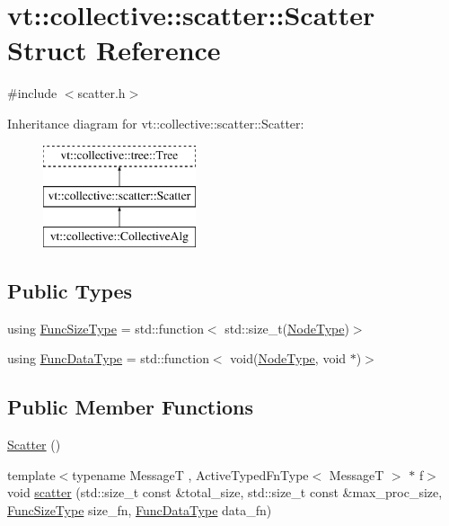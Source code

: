 \hypertarget{structvt_1_1collective_1_1scatter_1_1_scatter}{}\section{vt\+:\+:collective\+:\+:scatter\+:\+:Scatter Struct Reference}
\label{structvt_1_1collective_1_1scatter_1_1_scatter}


{\ttfamily \#include $<$scatter.\+h$>$}

Inheritance diagram for vt\+:\+:collective\+:\+:scatter\+:\+:Scatter\+:\begin{figure}[H]
\begin{center}
\leavevmode
\includegraphics[height=3.000000cm]{structvt_1_1collective_1_1scatter_1_1_scatter}
\end{center}
\end{figure}
\subsection*{Public Types}
\begin{DoxyCompactItemize}
\item 
using \hyperlink{structvt_1_1collective_1_1scatter_1_1_scatter_a977d895e42999a4078c6705ac851f447}{Func\+Size\+Type} = std\+::function$<$ std\+::size\+\_\+t(\hyperlink{namespacevt_a866da9d0efc19c0a1ce79e9e492f47e2}{Node\+Type})$>$
\item 
using \hyperlink{structvt_1_1collective_1_1scatter_1_1_scatter_a4040244e8ed36afd5d408c27efceea1b}{Func\+Data\+Type} = std\+::function$<$ void(\hyperlink{namespacevt_a866da9d0efc19c0a1ce79e9e492f47e2}{Node\+Type}, void $\ast$)$>$
\end{DoxyCompactItemize}
\subsection*{Public Member Functions}
\begin{DoxyCompactItemize}
\item 
\hyperlink{structvt_1_1collective_1_1scatter_1_1_scatter_a33ea9a78c5d43dcea4ec2cb69d8b00b4}{Scatter} ()
\item 
{\footnotesize template$<$typename MessageT , Active\+Typed\+Fn\+Type$<$ Message\+T $>$ $\ast$ f$>$ }\\void \hyperlink{structvt_1_1collective_1_1scatter_1_1_scatter_a0873f5fd4b890ad95e6ed6c097efe8bd}{scatter} (std\+::size\+\_\+t const \&total\+\_\+size, std\+::size\+\_\+t const \&max\+\_\+proc\+\_\+size, \hyperlink{structvt_1_1collective_1_1scatter_1_1_scatter_a977d895e42999a4078c6705ac851f447}{Func\+Size\+Type} size\+\_\+fn, \hyperlink{structvt_1_1collective_1_1scatter_1_1_scatter_a4040244e8ed36afd5d408c27efceea1b}{Func\+Data\+Type} data\+\_\+fn)
\end{DoxyCompactItemize}
